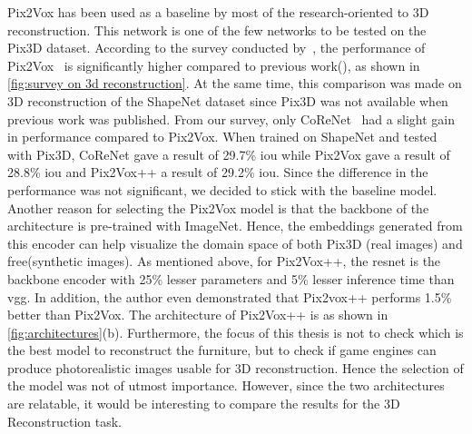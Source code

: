 Pix2Vox has been used as a baseline by most of the research-oriented to 3D reconstruction.
This network is one of the few networks to be tested on the Pix3D dataset.
According to the survey conducted by~\cite{Han2021ImageBased3O}, the performance of Pix2Vox~\cite{Xie_2019}
is significantly higher compared to previous work(\cite{Tulsiani2017,tatarchenko2016multiview,Roth2018,Gwak2018,Johnston2017}), as shown in \autoref{fig:survey on 3d reconstruction}.
At the same time, this comparison was made on 3D reconstruction of the ShapeNet dataset since Pix3D was not available when previous work was published.
From our survey, only CoReNet~\cite{popov2020corenet} had a slight gain in performance compared to Pix2Vox.
When trained on ShapeNet and tested with Pix3D, CoReNet gave a result of 29.7\% \gls{iou} while Pix2Vox gave a result of 28.8\% \gls{iou}  and Pix2Vox++ a result of 29.2\% \gls{iou}\@.
Since the difference in the performance was not significant, we decided to stick with the baseline model.
Another reason for selecting the Pix2Vox model is that the backbone of the architecture is pre-trained with ImageNet.
Hence, the embeddings generated from this encoder can help visualize the domain space of both Pix3D (real images)  and \gls{free}(synthetic images).
As mentioned above, for Pix2Vox++, the \gls{resnet} is the backbone encoder with 25\% lesser parameters and 5\% lesser inference time than \gls{vgg}\@.
In addition, the author even demonstrated that Pix2vox++ performs 1.5\% better than Pix2Vox.
The architecture of Pix2Vox++ is as shown in \autoref{fig:architectures}(b).
Furthermore, the focus of this thesis is not to check which is the best model to reconstruct the furniture, but to check if game engines can produce photorealistic images usable for 3D reconstruction.
Hence the selection of the model was not of utmost importance.
However, since the two architectures are relatable, it would be interesting to compare the results for the 3D Reconstruction task.

%

